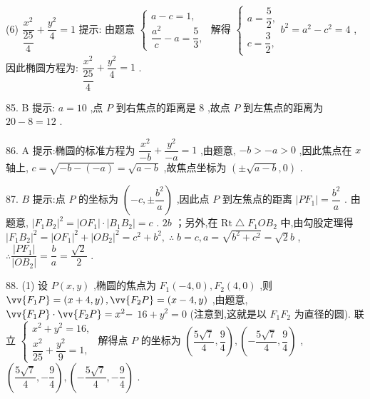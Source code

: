 (6) $\dfrac{{x}^{2}}{\dfrac{25}{4}} + \dfrac{{y}^{2}}{4} = 1$ 提示: 由题意 $\left\{  \begin{array}{l} a - c = 1, \\  \dfrac{{a}^{2}}{c} - a = \dfrac{5}{3}, \end{array}\right.$ 解得 $\left\{  \begin{array}{l} a = \dfrac{5}{2}, \\  c = \dfrac{3}{2}, \end{array}\right. {b}^{2} = {a}^{2} - {c}^{2} = 4$ ,因此椭圆方程为: $\dfrac{{x}^{2}}{\dfrac{25}{4}} + \dfrac{{y}^{2}}{4} = 1$ .

85. B 提示: $a = {10}$ ,点 $P$ 到右焦点的距离是 8 ,故点 $P$ 到左焦点的距离为 ${20} - 8 = {12}$ .

86. A 提示:椭圆的标准方程为 $\dfrac{{x}^{2}}{-b} + \dfrac{{y}^{2}}{-a} = 1$ ,由题意, $- b >  - a > 0$ ,因此焦点在 $x$ 轴上, $c = \sqrt{-b - \left( {-a}\right) } = \sqrt{a - b}$ ,故焦点坐标为 $\left( {\pm \sqrt{a - b},0}\right)$ .

87. $B$ 提示:点 $P$ 的坐标为 $\left( {-c, \pm  \dfrac{{b}^{2}}{a}}\right)$ ,因此点 $P$ 到左焦点的距离 $\left| {P{F}_{1}}\right|  = \dfrac{{b}^{2}}{a}$ . 由题意, ${\left| {F}_{1}{B}_{2}\right| }^{2} = \left| {O{F}_{1}}\right|  \cdot  \left| {{B}_{1}{B}_{2}}\right|  = c$ . ${2b}$ ；另外,在 $\mathrm{{Rt}} \bigtriangleup  {F}_{1}O{B}_{2}$ 中,由勾股定理得 ${\left| {F}_{1}{B}_{2}\right| }^{2} = {\left| O{F}_{1}\right| }^{2} + {\left| O{B}_{2}\right| }^{2} = {c}^{2} + {b}^{2},\;\therefore \;b = c,a = \sqrt{{b}^{2} + {c}^{2}} = \sqrt{2}b$ , $\therefore \dfrac{\left| P{F}_{1}\right| }{\left| O{B}_{2}\right| } = \dfrac{b}{a} = \dfrac{\sqrt{2}}{2}$ .

88. (1) 设 $P\left( {x,y}\right)$ ,椭圆的焦点为 ${F}_{1}\left( {-4,0}\right) ,{F}_{2}\left( {4,0}\right)$ ,则 $\vv{{F}_{1}P} = \left( {x + 4,y}\right) ,\vv{{F}_{2}P} = \left( {x - 4,y}\right)$ ,由题意, $\vv{{F}_{1}P} \cdot  \vv{{F}_{2}P} = {x}^{2} -$  ${16} + {y}^{2} = 0$ (注意到,这就是以 ${F}_{1}{F}_{2}$ 为直径的圆). 联立 $\left\{  \begin{array}{l} {x}^{2} + {y}^{2} = {16}, \\  \dfrac{{x}^{2}}{25} + \dfrac{{y}^{2}}{9} = 1, \end{array}\right.$ 解得点 $P$ 的坐标为 $\left( {\dfrac{5\sqrt{7}}{4},\dfrac{9}{4}}\right) ,\left( {-\dfrac{5\sqrt{7}}{4},\dfrac{9}{4}}\right)$ , $\left( {\dfrac{5\sqrt{7}}{4}, - \dfrac{9}{4}}\right) ,\left( {-\dfrac{5\sqrt{7}}{4}, - \dfrac{9}{4}}\right)$ .

